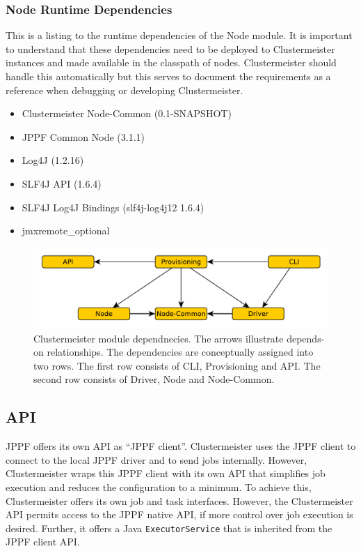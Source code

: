 \documentclass[12pt]{article}
\begin{document}
\subsubsection{Node Runtime Dependencies}
This is a listing to the runtime dependencies of the Node module. It is important to understand that these dependencies need to be deployed to Clustermeister instances and made available in the classpath of nodes. Clustermeister should handle this automatically but this serves to document the requirements as a reference when debugging or developing Clustermeister.

\begin{itemize}
 \item Clustermeister Node-Common (0.1-SNAPSHOT)
 \item JPPF Common Node (3.1.1)
 \item Log4J (1.2.16)
 \item SLF4J API (1.6.4)
 \item SLF4J Log4J Bindings (slf4j-log4j12 1.6.4)
 \item jmxremote\_optional
\end{itemize}

\begin{figure}[hp]
\centering
\includegraphics[scale=0.7]{images/module-deps.pdf}
\caption{Clustermeister module dependnecies. The arrows illustrate depends-on relationships. The dependencies are conceptually assigned into two rows. The first row consists of CLI, Provisioning and API. The second row consists of Driver, Node and Node-Common.}
\label{fig:deps}
\end{figure}

\subsection{API}

JPPF offers its own API as ``JPPF client''. Clustermeister uses the JPPF client to connect to the local JPPF driver and to send jobs internally. However, Clustermeister wraps this JPPF client with its own API that simplifies job execution and reduces the configuration to a minimum. To achieve this, Clustermeister offers its own job and task interfaces. However, the Clustermeister API permits access to the JPPF native API, if more control over job execution is desired. Further, it offers a Java \texttt{ExecutorService} that is inherited from the JPPF client API.
\end{document}

